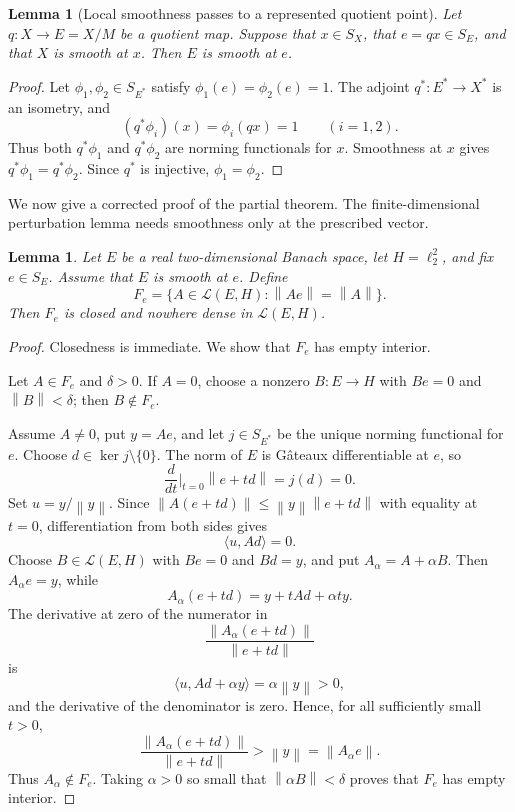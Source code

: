 \documentclass[11pt]{article}
\newtheorem{lemma}[theorem]{Lemma}
\theoremstyle{definition}
\newcommand{\calL}{\mathcal L}
\newcommand{\norm}[1]{\left\lVert #1\right\rVert}
\begin{document}
\begin{lemma}[Local smoothness passes to a represented quotient point]
\label{lem:quotient-smooth-point}
Let \(q:X\to E=X/M\) be a quotient map.  Suppose that \(x\in S_X\), that
\(e=qx\in S_E\), and that \(X\) is smooth at \(x\).  Then \(E\) is smooth at
\(e\).
\end{lemma}

\begin{proof}
Let \(\phi_1,\phi_2\in S_{E^*}\) satisfy
\(\phi_1(e)=\phi_2(e)=1\).  The adjoint \(q^*:E^*\to X^*\) is an isometry, and
\[
        (q^*\phi_i)(x)=\phi_i(qx)=1\qquad(i=1,2).
\]
Thus both \(q^*\phi_1\) and \(q^*\phi_2\) are norming functionals for \(x\).
Smoothness at \(x\) gives \(q^*\phi_1=q^*\phi_2\).  Since \(q^*\) is
injective, \(\phi_1=\phi_2\).
\end{proof}

We now give a corrected proof of the partial theorem.  The finite-dimensional
perturbation lemma needs smoothness only at the prescribed vector.

\begin{lemma}\label{lem:Fe}
Let \(E\) be a real two-dimensional Banach space, let \(H=\ell_2^2\), and
fix \(e\in S_E\).  Assume that \(E\) is smooth at \(e\).  Define
\[
        F_e=\{A\in\calL(E,H):\norm{Ae}=\norm{A}\}.
\]
Then \(F_e\) is closed and nowhere dense in \(\calL(E,H)\).
\end{lemma}

\begin{proof}
Closedness is immediate.  We show that \(F_e\) has empty interior.

Let \(A\in F_e\) and \(\delta>0\).  If \(A=0\), choose a nonzero
\(B:E\to H\) with \(Be=0\) and \(\norm{B}<\delta\); then \(B\notin F_e\).

Assume \(A\neq0\), put \(y=Ae\), and let \(j\in S_{E^*}\) be the unique
norming functional for \(e\).  Choose \(d\in\ker j\setminus\{0\}\).  The
norm of \(E\) is G\^ateaux differentiable at \(e\), so
\[
       \frac{d}{dt}\bigg|_{t=0}\norm{e+td}=j(d)=0.
\]
Set \(u=y/\norm{y}\).  Since \(\norm{A(e+td)}\leq
\norm{y}\norm{e+td}\) with equality at \(t=0\), differentiation from both
sides gives
\[
                     \langle u,Ad\rangle=0.
\]
Choose \(B\in\calL(E,H)\) with \(Be=0\) and \(Bd=y\), and put
\(A_\alpha=A+\alpha B\).  Then \(A_\alpha e=y\), while
\[
       A_\alpha(e+td)=y+tAd+\alpha t y.
\]
The derivative at zero of the numerator in
\[
       \frac{\norm{A_\alpha(e+td)}}{\norm{e+td}}
\]
is
\[
       \langle u,Ad+\alpha y\rangle=\alpha\norm{y}>0,
\]
and the derivative of the denominator is zero.  Hence, for all sufficiently
small \(t>0\),
\[
       \frac{\norm{A_\alpha(e+td)}}{\norm{e+td}}
       >\norm{y}=\norm{A_\alpha e}.
\]
Thus \(A_\alpha\notin F_e\).  Taking \(\alpha>0\) so small that
\(\norm{\alpha B}<\delta\) proves that \(F_e\) has empty interior.
\end{proof}
\end{document}
